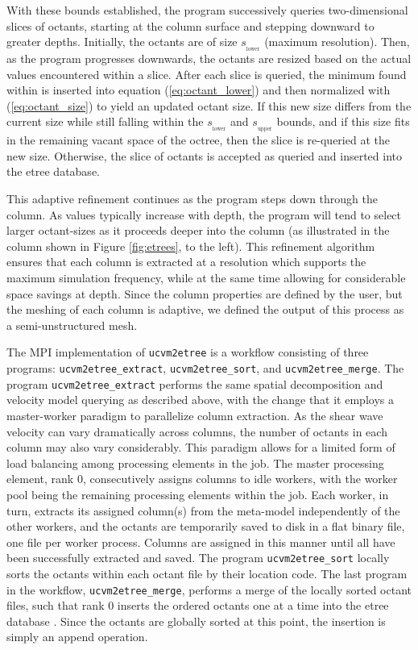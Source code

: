 With these bounds established, the program successively queries two-dimensional slices of octants, starting at the column surface and stepping downward to greater depths. Initially, the octants are of size $s_{_{\mathrm{lower}}}$ (maximum resolution). Then, as the program progresses downwards, the octants are resized based on the actual \vs{} values encountered within a slice. After each slice is queried, the minimum \vs{} found within is inserted into equation (\ref{eq:octant_lower}) and then normalized with (\ref{eq:octant_size}) to yield an updated octant size. If this new size differs from the current size while still falling within the $s_{_{\mathrm{lower}}}$ and $s_{_{\mathrm{upper}}}$ bounds, and if this size fits in the remaining vacant space of the octree, then the slice is re-queried at the new size. Otherwise, the slice of octants is accepted as queried and inserted into the etree database.

This adaptive refinement continues as the program steps down through the column. As \vs{} values typically increase with depth, the program will tend to select larger octant-sizes as it proceeds deeper into the column (as illustrated in the column shown in Figure \ref{fig:etrees}, to the left). This refinement algorithm ensures that each column is extracted at a resolution which supports the maximum simulation frequency, while at the same time allowing for considerable space savings at depth. Since the column properties are defined by the user, but the meshing of each column is adaptive, we defined the output of this process as a semi-unstructured mesh.

The MPI implementation of \texttt{ucvm2etree} is a workflow consisting of three programs: \texttt{ucvm2e\-tree\_extract}, \texttt{ucvm2etree\_sort}, and \texttt{ucvm2etree\_merge}. The program \texttt{ucvm2etree\_extract} performs the same spatial decomposition and velocity model querying as described above, with the change that it employs a master-worker paradigm to parallelize column extraction. As the shear wave velocity can vary dramatically across columns, the number of octants in each column may also vary considerably. This paradigm allows for a limited form of load balancing among processing elements in the job. The master processing element, rank 0, consecutively assigns columns to idle workers, with the worker pool being the remaining processing elements within the job. Each worker, in turn, extracts its assigned column(s) from the meta-model independently of the other workers, and the octants are temporarily saved to disk in a flat binary file, one file per worker process. Columns are assigned in this manner until all have been successfully extracted and saved. The program \texttt{ucvm2etree\_sort} locally sorts the octants within each octant file by their location code. The last program in the workflow, \texttt{ucvm2etree\_merge}, performs a merge of the locally sorted octant files, such that rank 0 inserts the ordered octants one at a time into the etree database \citep[in its natural $z$-order; see][]{Tu_2003_Tech}. Since the octants are globally sorted at this point, the insertion is simply an append operation. 

